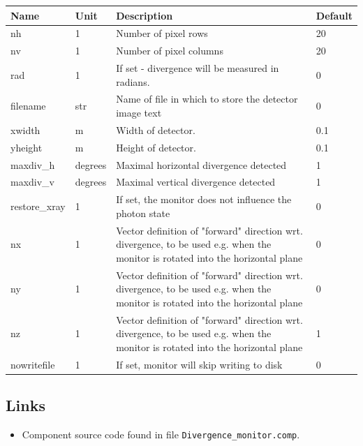 \begin{longtable}{p{}p{}p{}p{}}
\toprule
\textbf{Name} & \textbf{Unit} & \textbf{Description} & \textbf{Default} \\
\midrule
\endhead
nh & 1 & Number of pixel rows & 20 \\
nv & 1 & Number of pixel columns & 20 \\
rad & 1 & If set - divergence will be measured in radians. & 0 \\
filename & str & Name of file in which to store the detector image text & 0 \\
xwidth & m & Width of detector. & 0.1 \\
yheight & m & Height of detector. & 0.1 \\
maxdiv\_h & degrees & Maximal horizontal divergence detected & 1 \\
maxdiv\_v & degrees & Maximal vertical divergence detected & 1 \\
restore\_xray & 1 & If set, the monitor does not influence the photon state & 0 \\
nx & 1 & Vector definition of "forward" direction wrt. divergence, to be used e.g. when the monitor is rotated into the horizontal plane & 0 \\
ny & 1 & Vector definition of "forward" direction wrt. divergence, to be used e.g. when the monitor is rotated into the horizontal plane & 0 \\
nz & 1 & Vector definition of "forward" direction wrt. divergence, to be used e.g. when the monitor is rotated into the horizontal plane & 1 \\
nowritefile & 1 & If set, monitor will skip writing to disk & 0 \\
\bottomrule
\end{longtable}

\subsection*{Links}
\begin{itemize}
  \item Component source code found in file \texttt{Divergence\_monitor.comp}.
\end{itemize}
